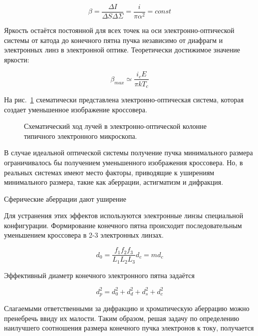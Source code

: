 \begin{equation}
\beta = \frac{\Delta I}{\Delta S\Delta\Sigma}= \frac{i}{\pi \alpha^2}= const
\label{eq:A2}
\end{equation}

Яркость остаётся постоянной для всех точек на оси электронно-оптической системы от катода до конечного пятна пучка независимо от диафрагм и электронных линз в электронной оптике. Теоретически достижимое значение яркости:

\begin{equation}
\beta_{max} \simeq \frac{i_c E}{\pi kT_c}
\label{eq:A3}
\end{equation}

На рис.~\ref{fig:3} схематически представлена электронно-оптическая система, которая создает уменьшенное изображение кроссовера.

\begin{figure}[H]
\center
\caption{Схематический ход лучей в электронно-оптической колонне типичного электронного микроскопа.}
\label{fig:3}
\end{figure}

В случае идеальной оптической системы получение пучка минимального размера ограничивалось бы получением уменьшенного изображения кроссовера. Но, в реальных системах имеют место факторы, приводящие к уширениям минимального размера, такие как аберрации, астигматизм и дифракция.

Сферические аберрации дают уширение


Для устранения этих эффектов используются электронные линзы специальной конфигурации.
Формирование конечного пятна происходит последовательным уменьшением кроссовера в 2-3 электронных линзах.

\begin{equation}
d_0= \frac{f_1 f_2 f_3}{L_1 L_2 L_3} d_c = md_c
\label{eq:A4}
\end{equation}

Эффективный диаметр конечного электронного пятна задаётся

\begin{equation}
d_p^2=d_0^2+d_d^2+d_s^2+d_c^2
\label{eq:A5}
\end{equation}

Слагаемыми ответственными за дифракцию и хроматическую аберрацию можно пренебречь ввиду их малости. Таким образом, решая задачу по определению наилучшего соотношения размера конечного пучка электронов к току, получается

